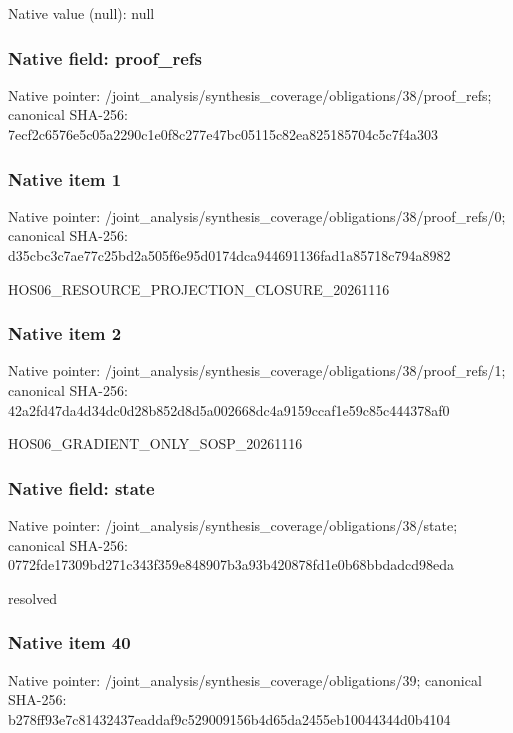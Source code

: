 \documentclass[10pt,a4paper]{article}
\begin{document}
Native value (null): null

\subsubsection{Native field: proof\_\allowbreak{}refs}
Native pointer: /joint\_\allowbreak{}analysis/synthesis\_\allowbreak{}coverage/obligations/38/proof\_\allowbreak{}refs; canonical SHA-256: 7ecf2c6576e5c05a2290c1e0f8c277e47bc05115c82ea825185704c5c7f4a303

\subsubsection{Native item 1}
Native pointer: /joint\_\allowbreak{}analysis/synthesis\_\allowbreak{}coverage/obligations/38/proof\_\allowbreak{}refs/0; canonical SHA-256: d35cbc3c7ae77c25bd2a505f6e95d0174dca944691136fad1a85718c794a8982

\begingroup\raggedright\sloppy HOS06\_\allowbreak{}RESOURCE\_\allowbreak{}PROJECTION\_\allowbreak{}CLOSURE\_\allowbreak{}20261116\par\endgroup

\subsubsection{Native item 2}
Native pointer: /joint\_\allowbreak{}analysis/synthesis\_\allowbreak{}coverage/obligations/38/proof\_\allowbreak{}refs/1; canonical SHA-256: 42a2fd47da4d34dc0d28b852d8d5a002668dc4a9159ccaf1e59c85c444378af0

\begingroup\raggedright\sloppy HOS06\_\allowbreak{}GRADIENT\_\allowbreak{}ONLY\_\allowbreak{}SOSP\_\allowbreak{}20261116\par\endgroup

\subsubsection{Native field: state}
Native pointer: /joint\_\allowbreak{}analysis/synthesis\_\allowbreak{}coverage/obligations/38/state; canonical SHA-256: 0772fde17309bd271c343f359e848907b3a93b420878fd1e0b68bbdadcd98eda

\begingroup\raggedright\sloppy resolved\par\endgroup

\subsubsection{Native item 40}
Native pointer: /joint\_\allowbreak{}analysis/synthesis\_\allowbreak{}coverage/obligations/39; canonical SHA-256: b278ff93e7c81432437eaddaf9c529009156b4d65da2455eb10044344d0b4104
\end{document}
